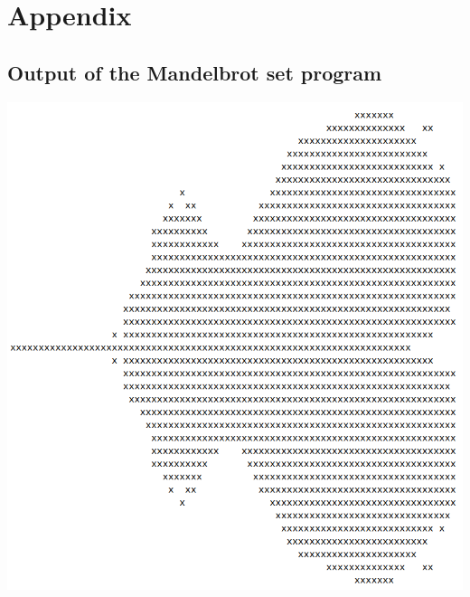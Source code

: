 ﻿\documentclass[10pt,a4paper,twocolumn,twoside]{article}
\begin{document}
\newpage
\appendix

\section*{Appendix}

\setcounter{section}{1}

\subsection{Output of the Mandelbrot set program}
\label{appendix:a}
\includegraphics[width=\linewidth]{mandelbrot}
\end{document}
